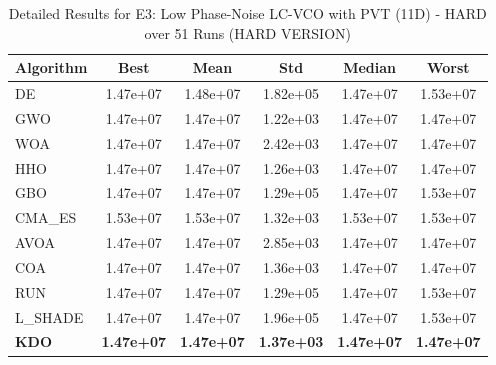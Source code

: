 \begin{table}[htbp]
\centering
\caption{Detailed Results for E3: Low Phase-Noise LC-VCO with PVT (11D) - HARD over 51 Runs (HARD VERSION)}
\label{tab:P3_detailed}
\small
\begin{tabular}{lccccc}
\toprule
\textbf{Algorithm} & \textbf{Best} & \textbf{Mean} & \textbf{Std} & \textbf{Median} & \textbf{Worst} \\
\midrule
DE & 1.47e+07 & 1.48e+07 & 1.82e+05 & 1.47e+07 & 1.53e+07 \\
GWO & 1.47e+07 & 1.47e+07 & 1.22e+03 & 1.47e+07 & 1.47e+07 \\
WOA & 1.47e+07 & 1.47e+07 & 2.42e+03 & 1.47e+07 & 1.47e+07 \\
HHO & 1.47e+07 & 1.47e+07 & 1.26e+03 & 1.47e+07 & 1.47e+07 \\
GBO & 1.47e+07 & 1.47e+07 & 1.29e+05 & 1.47e+07 & 1.53e+07 \\
CMA_ES & 1.53e+07 & 1.53e+07 & 1.32e+03 & 1.53e+07 & 1.53e+07 \\
AVOA & 1.47e+07 & 1.47e+07 & 2.85e+03 & 1.47e+07 & 1.47e+07 \\
COA & 1.47e+07 & 1.47e+07 & 1.36e+03 & 1.47e+07 & 1.47e+07 \\
RUN & 1.47e+07 & 1.47e+07 & 1.29e+05 & 1.47e+07 & 1.53e+07 \\
L_SHADE & 1.47e+07 & 1.47e+07 & 1.96e+05 & 1.47e+07 & 1.53e+07 \\
\textbf{KDO} & \textbf{1.47e+07} & \textbf{1.47e+07} & \textbf{1.37e+03} & \textbf{1.47e+07} & \textbf{1.47e+07} \\
\bottomrule
\end{tabular}
\end{table}
